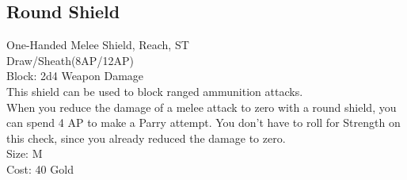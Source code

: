 \subsection{Round Shield}\label{weapon:roundShield}
One-Handed Melee Shield,  Reach, ST\\
Draw/Sheath(8AP/12AP)\\
Block: 2d4 Weapon Damage\\
This shield can be used to block ranged ammunition attacks.\\
When you reduce the damage of a melee attack to zero with a round shield, you can spend 4 AP to make a Parry attempt.
You don't have to roll for Strength on this check, since you already reduced the damage to zero.\\
Size: M\\
Cost: 40 Gold\\